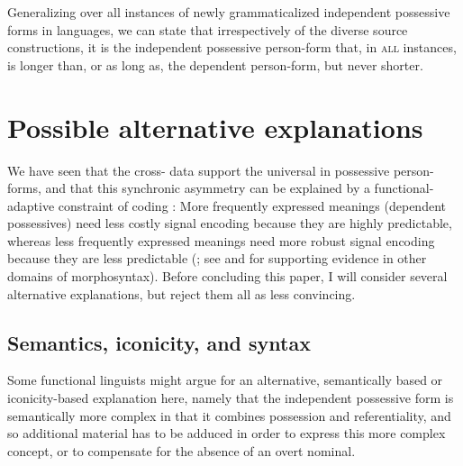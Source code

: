 \documentclass[output=paper]{langsci/langscibook}
\begin{document}
Generalizing over all instances of newly grammaticalized independent possessive forms in  languages, we can state that irrespectively of the diverse source constructions, it is the independent possessive person-form that, in \textsc{all} instances, is longer than, or as long as, the dependent person-form, but never shorter.


\section{Possible alternative explanations}\label{sec:michaelis:5}

We have seen that the cross- data support the universal  in possessive person-forms, and that this synchronic asymmetry can be explained by a functional-adaptive constraint of coding : More frequently expressed meanings (dependent possessives) need less costly signal encoding because they are highly predictable, whereas less frequently expressed meanings need more robust signal encoding because they are less predictable (; see \citealt{NorcliffeJaeger2016} and \citealt{JaegerBuz2018} for supporting  evidence in other domains of morphosyntax). Before concluding this paper, I will consider several alternative explanations, but reject them all as less convincing.


\subsection{ Semantics, iconicity, and syntax}

Some functional linguists might argue for an alternative, semantically based or iconicity-based explanation here, namely that the independent possessive form is semantically more complex in that it combines possession and referentiality, and so additional material has to be adduced in order to express this more complex concept, or to compensate for the absence of an overt nominal. 
\end{document}
